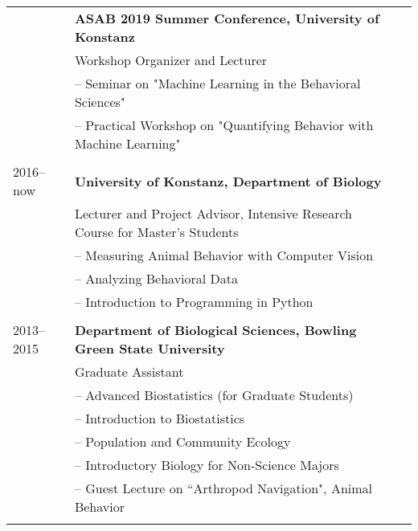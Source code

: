 \documentclass[letterpaper,6pt,oneside]{article}
\begin{document}
\begin{small}
\begin{longtable}{@{} l p{5.3in}l}
	& \textbf{ASAB 2019 Summer Conference, University of Konstanz} \\
	& Workshop Organizer and Lecturer\\
	& – Seminar on "Machine Learning in the Behavioral Sciences" \\
	& – Practical Workshop on "Quantifying Behavior with Machine Learning" \\
	& \\
 \large{2016–now}
    & \textbf{University of Konstanz, Department of Biology} \\
     & Lecturer and Project Advisor, Intensive Research Course for Master's Students \\
     & – Measuring Animal Behavior with Computer Vision \\
     & – Analyzing Behavioral Data \\
     & – Introduction to Programming in Python\\
     & \\
 \large{2013–2015}
 & \textbf{Department of Biological Sciences, Bowling Green State University} \\
 & Graduate Assistant \\
 & – Advanced Biostatistics (for Graduate Students)\\
 & – Introduction to Biostatistics \\
 & – Population and Community Ecology \\
 & – Introductory Biology for Non-Science Majors \\
 & – Guest Lecture on ``Arthropod Navigation", Animal Behavior \\
 & \\
 

\end{longtable}
\end{small}
\end{document}
